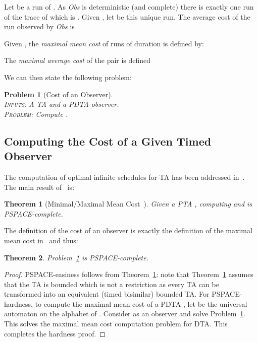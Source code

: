 \documentclass[letterpaper,10pt,conference]{ieeeconf}  \IEEEoverridecommandlockouts                              \overrideIEEEmargins
\newtheorem{prob}{Problem}  \newtheorem{definition}{Definition}
\newtheorem{theorem}{Theorem}
\def\obs{\textit{Obs}\xspace}
\begin{document}
Let  be a run of .  As \obs is deterministic (and complete)
there is exactly one run of  the trace of which is
.  Given , let  be
this unique run. 
The average cost of the run   observed by \obs is
.

Given , the \emph{maximal mean cost} of runs of
duration  is defined by:

The \emph{maximal average cost} of the pair  is defined

We can then state the following problem:
\begin{prob}[Cost of an Observer] \label{prob-cost-obs} \mbox{} \\
  \textsc{Inputs:} A  TA   and  a PDTA observer. \\
  \textsc{Problem:} Compute .
\end{prob}


\subsection{Computing the Cost of a Given Timed Observer}
The computation of optimal infinite schedules for TA has been
addressed in~\cite{BBL-fmsd06}.  The main result of~\cite{BBL-fmsd06}  is:
\begin{theorem}[Minimal/Maximal Mean
  Cost~\cite{BBL-fmsd06}]\label{thm-pat}
  Given a PTA , com\-puting  and  is
  PSPACE-complete.
\end{theorem}
The definition of the cost of an observer is exactly the defi\-ni\-tion
of the maximal mean cost in~\cite{BBL-fmsd06} and thus:
\begin{theorem}
  Problem~\ref{prob-cost-obs} is PSPACE-complete.
\end{theorem}
\begin{proof}
  PSPACE-easiness follows from Theorem~\ref{thm-pat}: note that
  Theorem~\ref{thm-pat} assumes that the TA is bounded which is not a
  restriction as every TA can be transformed into an equivalent (timed
  bisimilar) bounded TA. For PSPACE-hardness, to compute the maximal
  mean cost of a PDTA , let  be the universal automaton on the
  alphabet of .  Consider  as an observer and solve
  Problem~\ref{prob-cost-obs}.  This solves the maximal mean cost
  computation problem for DTA.  This completes the hardness proof.
\end{proof}
\end{document}
